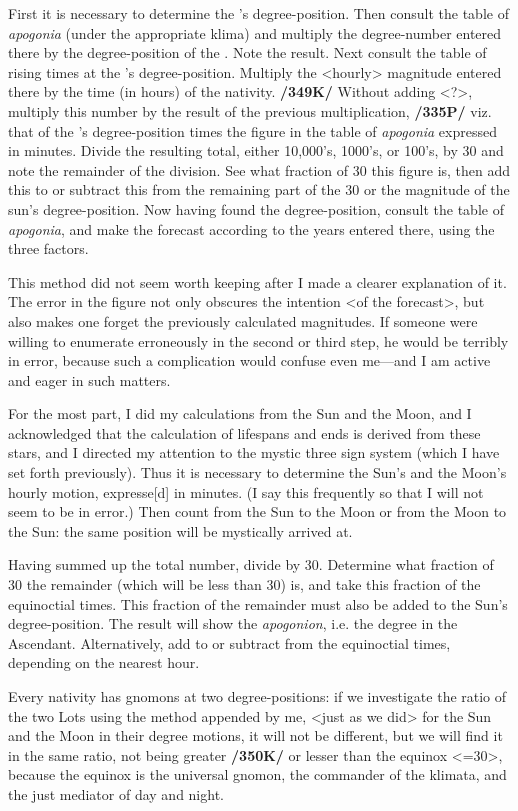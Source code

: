 First it is necessary to determine the \Sun’s degree-position. Then consult the table of \textit{apogonia} (under the appropriate klima) and multiply the degree-number entered there by the degree-position of the \Sun. Note the result. Next consult the table of rising times at the \Sun’s degree-position. Multiply the <hourly> magnitude entered there by the time (in hours) of the nativity. \textbf{/349K/} Without adding <?>, multiply this number by the result of the previous multiplication, \textbf{/335P/} viz. that of the \Sun’s degree-position times the figure in the table of \textit{apogonia} expressed in minutes. Divide the resulting total, either 10,000’s, 1000’s, or 100’s, by 30 and note the remainder of the division. See what fraction of 30 this figure is, then add this to or subtract this from the remaining part of the 30 or the magnitude of the sun’s degree-position. Now having found the degree-position, consult the table of \textit{apogonia}, and make the forecast according to the years entered there, using the three factors.

This method did not seem worth keeping after I made a clearer explanation of it. The error in the figure not only obscures the intention <of the forecast>, but also makes one forget the previously calculated
magnitudes. If someone were willing to enumerate erroneously in the second or third step, he would be terribly in error, because such a complication would confuse even me—and I am active and eager in such matters.

For the most part, I did my calculations from the Sun and the Moon, and I acknowledged that the calculation of lifespans and ends is derived from these stars, and I directed my attention to the mystic three sign
system (which I have set forth previously). Thus it is necessary to determine the Sun’s and the Moon’s hourly motion, expresse[d] in minutes. (I say this frequently so that I will not seem to be in error.)
Then count from the Sun to the Moon or from the Moon to the Sun: the same position will be mystically arrived at. 

Having summed up the total number, divide by 30. Determine what fraction of 30 the remainder (which will be less than 30) is, and take this fraction of the equinoctial times. This fraction of the remainder must also be added to the Sun’s degree-position. The result will show the \textit{apogonion}, i.e. the degree in the Ascendant. Alternatively, add to or subtract from the equinoctial times, depending on the
nearest hour.

Every nativity has gnomons at two degree-positions: if we investigate the ratio of the two Lots using the method appended by me, <just as we did> for the Sun and the Moon in their degree motions, it will not be different, but we will find it in the same ratio, not being greater \textbf{/350K/} or lesser than the equinox <=30>, because the equinox is the universal gnomon, the commander of the klimata, and the just mediator of day and night.

